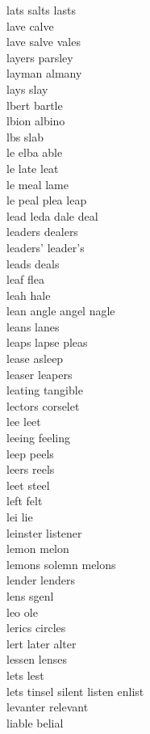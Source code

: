 lats salts lasts \\
lave calve \\
lave salve vales \\
layers parsley \\
layman almany\\
lays slay\\
lbert bartle \\
lbion albino \\
lbs slab \\
le elba able  \\
le late leat  \\
le meal lame  \\
le peal plea leap  \\
lead leda dale deal\\
leaders dealers\\
leaders' leader's\\
leads deals\\
leaf flea\\
leah hale\\
lean angle angel nagle \\
leans lanes\\
leaps lapse pleas\\
lease asleep \\
leaser leapers \\
leating tangible \\
lectors corselet \\
lee leet \\
leeing feeling \\
leep peels \\
leers reels\\
leet steel \\
left felt\\
lei lie\\
leinster listener\\
lemon melon\\
lemons solemn melons\\
lender lenders \\
lens sgenl \\
leo ole\\
lerics circles \\
lert later alter \\
lessen lenses\\
lets lest\\
lets tinsel silent listen enlist  \\
levanter relevant\\
liable belial\\
